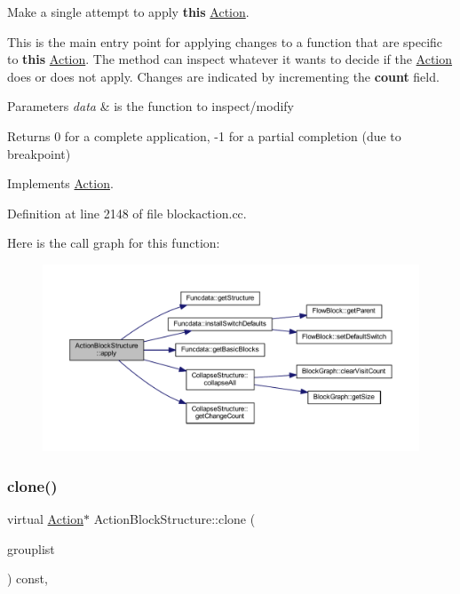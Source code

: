 Make a single attempt to apply {\bfseries{this}} \mbox{\hyperlink{class_action}{Action}}. 

This is the main entry point for applying changes to a function that are specific to {\bfseries{this}} \mbox{\hyperlink{class_action}{Action}}. The method can inspect whatever it wants to decide if the \mbox{\hyperlink{class_action}{Action}} does or does not apply. Changes are indicated by incrementing the {\bfseries{count}} field. 
\begin{DoxyParams}{Parameters}
{\em data} & is the function to inspect/modify \\
\hline
\end{DoxyParams}
\begin{DoxyReturn}{Returns}
0 for a complete application, -\/1 for a partial completion (due to breakpoint) 
\end{DoxyReturn}


Implements \mbox{\hyperlink{class_action_aac1c3999d6c685b15f5d9765a4d04173}{Action}}.



Definition at line 2148 of file blockaction.\+cc.

Here is the call graph for this function\+:
\nopagebreak
\begin{figure}[H]
\begin{center}
\leavevmode
\includegraphics[width=350pt]{class_action_block_structure_a59e5e7c8f0d703b778d06e2e6373cd27_cgraph}
\end{center}
\end{figure}
\mbox{\label{class_action_block_structure_ab86eb695c4acc6d3e69cbbc844445fdc}} 
\subsubsection{\texorpdfstring{clone()}{clone()}}
{\footnotesize\ttfamily virtual \mbox{\hyperlink{class_action}{Action}}$\ast$ Action\+Block\+Structure\+::clone (\begin{DoxyParamCaption}\item[{const \mbox{\hyperlink{class_action_group_list}{Action\+Group\+List}} \&}]{grouplist }\end{DoxyParamCaption}) const\hspace{0.3cm}{\ttfamily [inline]}, {\ttfamily [virtual]}}



